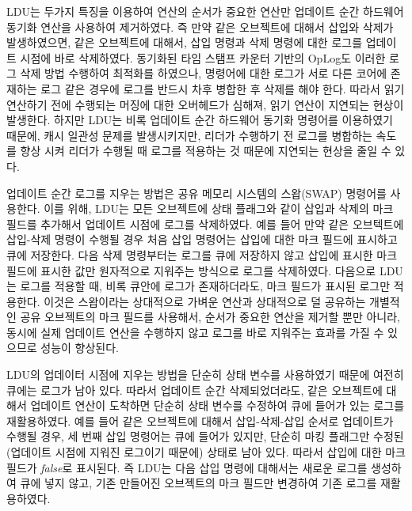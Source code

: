 LDU는 두가지 특징을 이용하여 연산의 순서가 중요한 연산만 업데이트 순간 하드웨어 
동기화 연산을 사용하여 제거하였다. 
즉 만약 같은 오브젝트에 대해서 삽입와 삭제가 발생하였으면, 
같은 오브젝트에 대해서, 삽입 명령과 삭제 명령에 대한 로그를 업데이트 시점에 바로 삭제하였다. 
동기화된 타임 스탬프 카운터 기반의 OpLog도 이러한 로그 삭제 방법 
수행하여 최적화를 하였으나, 명령어에 대한 로그가 서로 다른 코어에 존재하는 로그 같은 경우에 
로그를 반드시 차후 병합한 후 삭제를 해야 한다.
따라서 읽기 연산하기 전에 수행되는 머징에 대한 오버헤드가 심해져, 읽기 연산이 지연되는 현상이 발생한다.
하지만 LDU는 비록 업데이트 순간 하드웨어 동기화 명령어를 이용하였기 때문에,
캐시 일관성 문제를 발생시키지만, 리더가 수행하기 전 로그를 병합하는 속도를 향상 시켜 
리더가 수행될 때 로그를 적용하는 것 때문에 지연되는 현상을 줄일 수 있다.

업데이트 순간 로그를 지우는 방법은 공유 메모리 시스템의 스왑(SWAP) 명령어를 사용한다.
이를 위해, LDU는 모든 오브젝트에 상태 플래그와 같이 삽입과 삭제의 마크 필드를 추가해서 
업데이트 시점에 로그를 삭제하였다. 
예를 들어 만약 같은 오브텍트에 삽입-삭제 명령이 수행될 경우 처음 삽입 명령어는
삽입에 대한 마크 필드에 표시하고 큐에 저장한다. 
다음 삭제 명령부터는 로그를 큐에 저장하지 않고 삽입에 표시한 마크 필드에 표시한 값만
원자적으로 지워주는 방식으로 로그를 삭제하였다.
다음으로 LDU는 로그를 적용할 때, 비록 큐안에 로그가 존재하더라도, 마크 필드가 표시된 로그만 
적용한다.
이것은 스왑이라는 상대적으로 가벼운 연산과 상대적으로 덜 공유하는 개별적인 공유 오브젝트의
마크 필드를 사용해서, 순서가 중요한 연산을 제거할 뿐만 아니라, 동시에 실제
업데이트 연산을 수행하지 않고 로그를 바로 지워주는 효과를 가질 수 있으므로 성능이 향상된다. 

LDU의 업데이터 시점에 지우는 방법을 단순히 상태 변수를 사용하였기 때문에 여전히 큐에는 로그가 남아 있다.
따라서 업데이트 순간 삭제되었더라도, 같은 오브젝트에 대해서 업데이트 연산이 도착하면 
단순히 상태 변수를 수정하여 큐에 들어가 있는 로그를 재활용하였다.
예를 들어 같은 오브젝트에 대해서 삽입-삭제-삽입 순서로 업데이트가 수행될 경우, 
세 번째 삽입 명령어는 큐에 들어가 있지만, 단순히 마킹 플래그만 
수정된(업데이트 시점에 지워진 로그이기 때문에) 상태로 남아 있다. 
따라서 삽입에 대한 마크 필드가 \textit{false}로 표시된다. 
즉 LDU는 다음 삽입 명령에 대해서는 새로운 로그를 생성하여 큐에 넣지 않고, 
기존 만들어진 오브젝트의 마크 필드만 변경하여 기존 로그를 재활용하였다.

